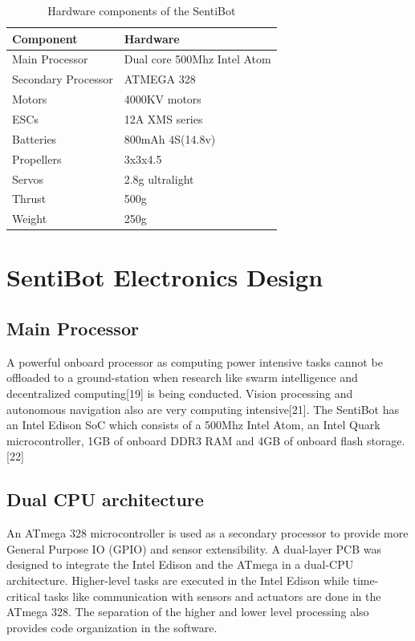 \documentclass[12pt]{article}
\begin{document}
\begin{table}[h]
	\centering
	\begin{tabular}{ | l | l | }
		Component & Hardware \\
		\hline
		Main Processor & Dual core 500Mhz Intel Atom \\
		Secondary Processor & ATMEGA 328 \\
		Motors & 4000KV motors \\
		ESCs & 12A XMS series \\
		Batteries & 800mAh 4S(14.8v) \\
		Propellers & 3x3x4.5 \\
		Servos & 2.8g ultralight \\
		Thrust & 500g \\
		Weight & 250g \\
	\end{tabular}
	\caption{Hardware components of the SentiBot}
	\label{fig:sb-components}
\end{table}

\section{SentiBot Electronics Design}

\subsection{Main Processor}

A powerful onboard processor as computing power intensive tasks cannot be offloaded to a ground-station when research like swarm intelligence and decentralized computing[19] is being conducted. Vision processing and autonomous navigation also are very computing intensive[21]. The SentiBot has an Intel Edison SoC which consists of a 500Mhz Intel Atom, an Intel Quark microcontroller, 1GB of onboard DDR3 RAM and 4GB of onboard flash storage.[22] 

\subsection{Dual CPU architecture}

An ATmega 328 microcontroller is used as a secondary processor to provide more General Purpose IO (GPIO) and sensor extensibility. A dual-layer PCB was designed to integrate the Intel Edison and the ATmega in a dual-CPU architecture. Higher-level tasks are executed in the Intel Edison while time-critical tasks like communication with sensors and actuators are done in the ATmega 328. The separation of the higher and lower level processing also provides code organization in the software.
\end{document}
